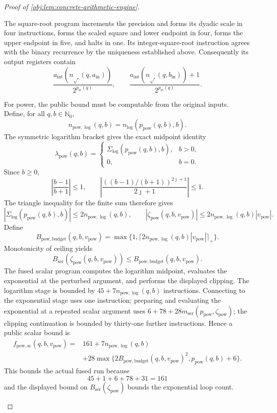 \begin{proof}[Proof of \cref{obj:lem:concrete-arithmetic-engine}]
\begin{enumerate}
The square-root program increments the precision and forms its dyadic scale in four instructions, forms the scaled square and lower endpoint in four, forms the upper endpoint in five, and halts in one. Its integer-square-root instruction agrees with the binary recurrence by the uniqueness established above. Consequently its output registers contain
\[
\frac{a_{\mathrm{int}}(n_{\sqrt{\ }}(q,a_{\mathrm{in}}))}
     {2^{p_{\mathrm{sc}}(q)}},
\qquad
\frac{a_{\mathrm{int}}(n_{\sqrt{\ }}(q,b_{\mathrm{in}}))+1}
     {2^{p_{\mathrm{sc}}(q)}}.
\]

For power, the public bound must be computable from the original inputs. Define, for all \(q,b\in\mathbb N_0\),
\[
n_{\mathrm{pow},\log}(q,b)
 =n_{\log}(p_{\mathrm{pow}}(q,b),b).
\]
The symmetric logarithm bracket gives the exact midpoint identity
\[
\lambda_{\mathrm{pow}}(q,b)=
\begin{cases}
\Sigma_{\log}(p_{\mathrm{pow}}(q,b),b),&b>0,\\
0,&b=0.
\end{cases}
\]
Since \(b\ge0\),
\[
\left|\frac{b-1}{b+1}\right|\le1,
\qquad
\left|
 \frac{((b-1)/(b+1))^{2\jmath+1}}{2\jmath+1}
\right|\le1.
\]
The triangle inequality for the finite sum therefore gives
\[
|\Sigma_{\log}(p_{\mathrm{pow}}(q,b),b)|
 \le2n_{\mathrm{pow},\log}(q,b),
\qquad
|\zeta_{\mathrm{pow}}(q,b,v_{\mathrm{pow}})|
 \le2n_{\mathrm{pow},\log}(q,b)|v_{\mathrm{pow}}|.
\]
Define
\[
B_{\mathrm{pow},\mathrm{budget}}(q,b,v_{\mathrm{pow}})
 =\max\{1,\lceil
       2n_{\mathrm{pow},\log}(q,b)|v_{\mathrm{pow}}|
       \rceil_+\}.
\]
Monotonicity of ceiling yields
\[
B_{\mathrm{ser}}(\zeta_{\mathrm{pow}}(q,b,v_{\mathrm{pow}}))
 \le B_{\mathrm{pow},\mathrm{budget}}(q,b,v_{\mathrm{pow}}).
\]
The fused scalar program computes the logarithm midpoint, evaluates the exponential at the perturbed argument, and performs the displayed clipping. The logarithm stage is bounded by
\(45+7n_{\mathrm{pow},\log}(q,b)\) instructions. Connecting to the exponential stage uses one instruction; preparing and evaluating the exponential at a repeated scalar argument uses
\(6+78+28m_{\mathrm{ser}}(p_{\mathrm{pow}},\zeta_{\mathrm{pow}})\);
the clipping continuation is bounded by thirty-one further instructions. Hence a public scalar bound is
\[
\begin{split}
f_{\mathrm{pow},\mathrm{sc}}(q,b,v_{\mathrm{pow}})
={}&161+7n_{\mathrm{pow},\log}(q,b)\\
&+28\max\{
  2B_{\mathrm{pow},\mathrm{budget}}(q,b,v_{\mathrm{pow}})^2,
  p_{\mathrm{pow}}(q,b)+6\}.
\end{split}
\]
This bounds the actual fused run because
\[
45+1+6+78+31=161
\]
and the displayed bound on \(B_{\mathrm{ser}}(\zeta_{\mathrm{pow}})\)
bounds the exponential loop count.


\end{enumerate}
\end{proof}
